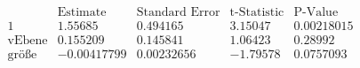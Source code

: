 \[\begin{array}{l|llll}
 \text{} & \text{Estimate} & \text{Standard Error} & \text{t-Statistic} & \text{P-Value} \\
\hline
 1 & 1.55685 & 0.494165 & 3.15047 & 0.00218015 \\
 \text{vEbene} & 0.155209 & 0.145841 & 1.06423 & 0.28992 \\
 \text{gr{\" o}{\ss}e} & -0.00417799 & 0.00232656 & -1.79578 & 0.0757093 \\
\end{array}\]

